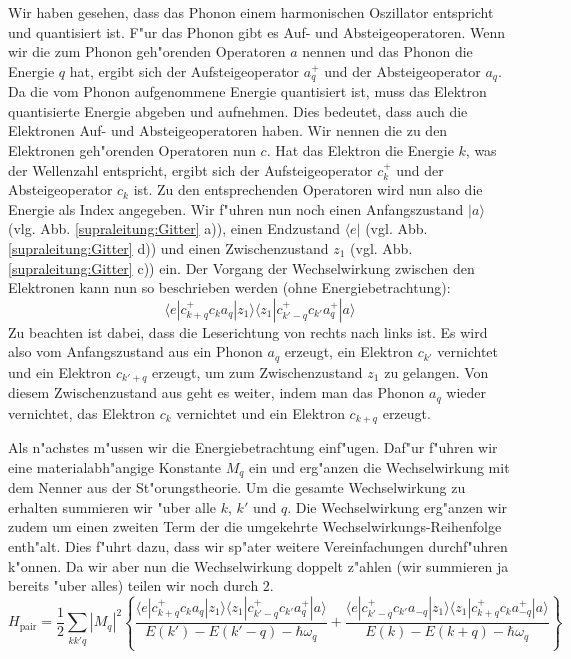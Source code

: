 \begin{refsection}
Wir haben gesehen, dass das Phonon einem harmonischen Oszillator entspricht und quantisiert ist.
F"ur das Phonon gibt es Auf- und Absteigeoperatoren.
Wenn wir die zum Phonon geh"orenden Operatoren $a$ nennen und das Phonon die Energie $q$ hat,
ergibt sich der Aufsteigeoperator
$a^+_q$ und der Absteigeoperator $a_q$.
Da die vom Phonon aufgenommene Energie quantisiert ist, muss das Elektron quantisierte Energie
abgeben und aufnehmen.
Dies bedeutet, dass auch die Elektronen Auf- und Absteigeoperatoren haben.
Wir nennen die zu den Elektronen geh"orenden Operatoren nun $c$. Hat das Elektron die Energie $k$,
was der Wellenzahl entspricht, ergibt sich der Aufsteigeoperator $c^+_k$ und der
Absteigeoperator $c_k$ ist.
Zu den entsprechenden Operatoren wird nun also die Energie als Index angegeben.
Wir f"uhren nun noch einen Anfangszustand $|a\rangle$ (vlg. Abb. \ref{supraleitung:Gitter} a)),
einen Endzustand $\langle e|$ (vgl. Abb. \ref{supraleitung:Gitter} d)) und
einen Zwischenzustand $z_1$ (vgl. Abb. \ref{supraleitung:Gitter} c)) ein.
Der Vorgang der Wechselwirkung zwischen den Elektronen kann nun so beschrieben werden
(ohne Energiebetrachtung):
\begin{equation}
\langle e|c^+_{k+q} c_k a_q |z_1\rangle\langle z_1| c^+_{k'-q} c_{k'} a^+_q |a\rangle
\label{supraleitung:WechselwirkungOE}
\end{equation}
Zu beachten ist dabei, dass die Leserichtung von rechts nach links ist.
Es wird also vom Anfangszustand aus ein Phonon $a_q$ erzeugt, ein Elektron $c_{k'}$ vernichtet
und ein Elektron $c_{k'+q}$ erzeugt, um zum Zwischenzustand $z_1$ zu gelangen.
Von diesem Zwischenzustand aus geht es weiter, indem man das Phonon $a_q$ wieder vernichtet,
das Elektron $c_k$ vernichtet und ein Elektron $c_{k+q}$ erzeugt.

Als n"achstes m"ussen wir die Energiebetrachtung einf"ugen.
Daf"ur f"uhren wir eine materialabh"angige Konstante $M_q$ ein und erg"anzen die
Wechselwirkung mit dem Nenner aus der St"orungstheorie.
Um die gesamte Wechselwirkung zu erhalten summieren wir "uber alle $k$, $k'$ und $q$.
Die Wechselwirkung erg"anzen wir zudem um einen zweiten Term der die umgekehrte
Wechselwirkungs-Reihenfolge enth"alt.
Dies f"uhrt dazu, dass wir sp"ater weitere Vereinfachungen durchf"uhren k"onnen.
Da wir aber nun die Wechselwirkung doppelt z"ahlen (wir summieren ja bereits "uber alles)
teilen wir noch durch $2$.
\begin{equation}
H_{\text{pair}}=
\frac{1}{2}
\sum \limits_{kk'q} |M_q|^2
\left\{
\frac
{\langle e|c^+_{k+q} c_k a_q |z_1\rangle\langle z_1| c^+_{k'-q} c_{k'} a^+_q |a\rangle }
{E(k')-E(k'-q)-\hbar\omega_q}
+
\frac
{\langle e|c^+_{k'-q} c_{k'} a_{-q}|z_1\rangle\langle z_1| c^+_{k+q} c_k a^+_{-q} |a\rangle }
{E(k)-E(k+q)-\hbar\omega_q}
\right\}
\label{supraleitung:WechselwirkungME}
\end{equation}


\end{refsection}
